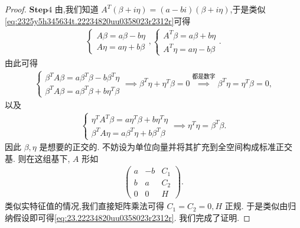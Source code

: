 \documentclass[../../main.tex]{subfiles}%
\begin{document}
\begin{proof}
$\mathbf{Step}4$  由,我们知道 $A^T(\beta + i\eta) = (a - bi)(\beta + i\eta)$,于是类似\eqref{eq:2325y5h345634t.22234820uu0358023r2312r}可得
\begin{align*}
\begin{cases} 
A\beta = a\beta - b\eta \\
A\eta = a\eta + b\beta 
\end{cases},
\begin{cases} 
A^T\beta = a\beta + b\eta \\
A^T\eta = a\eta - b\beta 
\end{cases}.
\end{align*}
由此可得
\begin{align*}
\begin{cases} 
\beta^TA\beta = a\beta^T\beta - b\beta^T\eta \\
\beta^TA\beta = a\beta^T\beta + b\eta^T\beta 
\end{cases}
\implies \beta^T\eta + \eta^T\beta = 0 \stackrel{\text{都是数字}}{\implies} \beta^T\eta = \eta^T\beta = 0,
\end{align*}
以及
\begin{align*}
\begin{cases} 
\eta^TA^T\beta = a\eta^T\beta + b\eta^T\eta \\
\beta^TA\eta = a\beta^T\eta + b\beta^T\beta 
\end{cases}
\implies \eta^T\eta = \beta^T\beta.
\end{align*}
因此 $\beta,\eta$ 是想要的正交的. 不妨设为单位向量并将其扩充到全空间构成标准正交基. 则在这组基下, $A$ 形如
\begin{align*}
\begin{pmatrix} a & -b & C_1 \\ b & a & C_2 \\ 0 & 0 & H \end{pmatrix}.
\end{align*}
类似实特征值的情况,我们直接矩阵乘法可得 $C_1 = C_2 = 0, H$ 正规. 于是类似由归纳假设即可得\eqref{eq:23.22234820uu0358023r2312r}. 我们完成了证明.

\end{proof}
\end{document}
